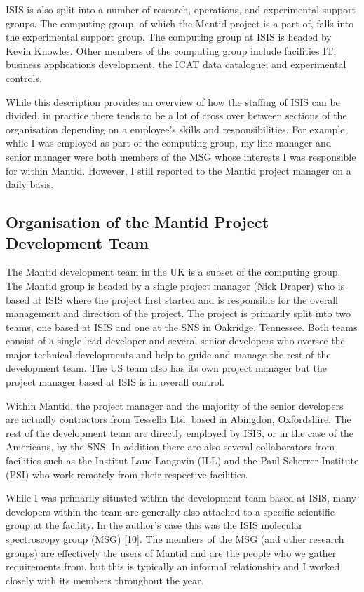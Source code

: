 \documentclass[paper=a4, fontsize=11pt]{scrartcl}	%
\numberwithin{equation}{section}															%
\numberwithin{figure}{section}																%
\numberwithin{table}{section}
\begin{document}
ISIS is also split into a number of research, operations, and
experimental support groups. The computing group, of which the Mantid
project is a part of, falls into the experimental support group. The
computing group at ISIS is headed by Kevin Knowles. Other members of the
computing group include facilities IT, business applications
development, the ICAT data catalogue, and experimental controls.

While this description provides an overview of how the staffing of ISIS
can be divided, in practice there tends to be a lot of cross over
between sections of the organisation depending on a employee's skills
and responsibilities. For example, while I was employed as part of the
computing group, my line manager and senior manager were both
members of the MSG whose interests I
was responsible for within Mantid. However, I still reported to the
Mantid project manager on a daily basis.

\subsection{Organisation of the Mantid Project Development
Team}\label{organisation-of-the-mantid-project-development-team}

The Mantid development team in the UK is a subset of the computing group. The Mantid group is headed by a single project manager (Nick
Draper) who is based at ISIS where the project first started and is
responsible for the overall management and direction of the project. The
project is primarily split into two teams, one based at ISIS and one at the SNS in
Oakridge, Tennessee. Both teams consist of a single lead developer and
several senior developers who oversee the major technical developments
and help to guide and manage the rest of the development team. The US
team also has its own project manager but the project manager based at
ISIS is in overall control.

Within Mantid, the project manager and the majority of the senior
developers are actually contractors from Tessella Ltd. based in
Abingdon, Oxfordshire. The rest of the development team are directly
employed by ISIS, or in the case of the Americans, by the SNS. In
addition there are also several collaborators from facilities such as
the Institut Laue-Langevin (ILL) and the Paul Scherrer Institute (PSI)
who work remotely from their respective facilities.

While I was primarily situated within the development team based at
ISIS, many developers within the team are generally also attached to a
specific scientific group at the facility. In the author's case this was
the ISIS molecular spectroscopy group (MSG) {[}10{]}. The members of the
MSG (and other research groups) are effectively the users of Mantid and
are the people who we gather requirements from, but this is
typically an informal relationship and I worked closely with its
members throughout the year.
\end{document}
